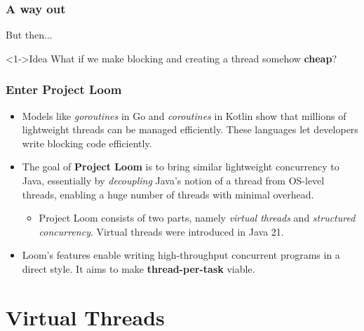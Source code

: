 \documentclass[xcolor={dvipsnames,svgnames},aspectratio=169]{beamer}
\begin{document}
\begin{frame}[fragile]
  \frametitle{A way out}

  But then...
  \vspace{0.2cm}
  \begin{block}<1->{\faLightbulb \quad Idea}
    What if we make blocking and creating a thread somehow \textbf{cheap}?
  \end{block}
\end{frame}

\begin{frame}[fragile]
  \frametitle{Enter Project Loom}

  \begin{itemize}
  \item[\faBook]<1-> Models like \emph{goroutines}
    in Go and \emph{coroutines} in Kotlin show that millions of lightweight
    threads can be managed efficiently. These languages let developers write
    blocking code efficiently.
  \item[\faBook]<2-> The goal of \textbf{Project Loom} is to bring similar lightweight
    concurrency to Java, essentially by \emph{decoupling} Java's notion of a
    thread from OS-level threads, enabling a huge number of threads with minimal
    overhead.
    \begin{itemize}
    \item[\faBook]<2-> Project Loom consists of two parts, namely \emph{virtual threads} and
      \emph{structured concurrency}. Virtual threads were introduced in Java 21.
    \end{itemize}
  \item[\faBook]<3-> Loom's features enable writing high-throughput concurrent
    programs in a direct style. It aims to make \textbf{thread-per-task} viable.
  \end{itemize}
\end{frame}

\section{Virtual Threads}
\end{document}
